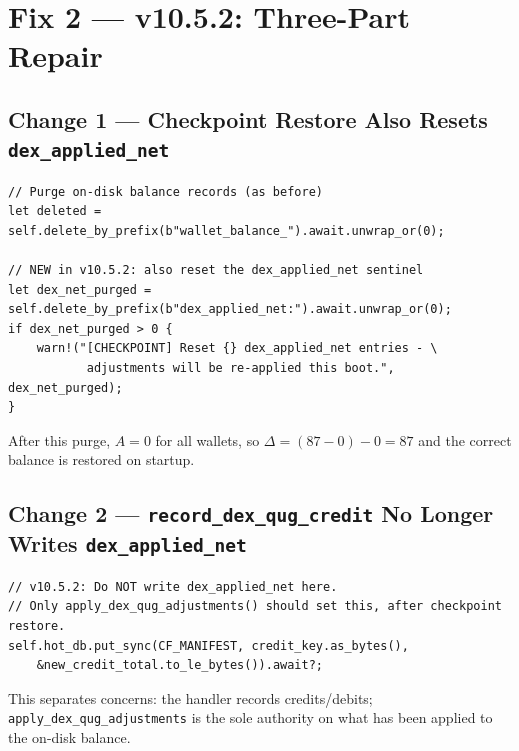 \documentclass[11pt,a4paper]{article}
\begin{document}
\section{Fix 2 — v10.5.2: Three-Part Repair}

\subsection{Change 1 — Checkpoint Restore Also Resets \texttt{dex\_applied\_net}}

\begin{lstlisting}[caption={\texttt{crates/q-storage/src/lib.rs} — checkpoint restore (~line 5511)},
                   label={lst:fix1}]
// Purge on-disk balance records (as before)
let deleted = self.delete_by_prefix(b"wallet_balance_").await.unwrap_or(0);

// NEW in v10.5.2: also reset the dex_applied_net sentinel
let dex_net_purged = self.delete_by_prefix(b"dex_applied_net:").await.unwrap_or(0);
if dex_net_purged > 0 {
    warn!("[CHECKPOINT] Reset {} dex_applied_net entries - \
           adjustments will be re-applied this boot.", dex_net_purged);
}
\end{lstlisting}

After this purge, $A = 0$ for all wallets, so $\Delta = (87 - 0) - 0 = 87$
and the correct balance is restored on startup.

\subsection{Change 2 — \texttt{record\_dex\_qug\_credit} No Longer Writes \texttt{dex\_applied\_net}}

\begin{lstlisting}[caption={\texttt{crates/q-storage/src/lib.rs} — \texttt{record\_dex\_qug\_credit} (~line 9428)},
                   label={lst:fix2}]
// v10.5.2: Do NOT write dex_applied_net here.
// Only apply_dex_qug_adjustments() should set this, after checkpoint restore.
self.hot_db.put_sync(CF_MANIFEST, credit_key.as_bytes(),
    &new_credit_total.to_le_bytes()).await?;
\end{lstlisting}

This separates concerns: the handler records credits/debits;
\texttt{apply\_dex\_qug\_adjustments} is the sole authority on what has been
applied to the on-disk balance.
\end{document}
